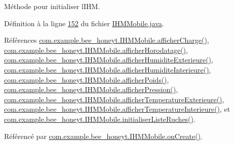 Méthode pour initialiser l\textquotesingle{}I\+HM. 



Définition à la ligne \hyperlink{_i_h_m_mobile_8java_source_l00152}{152} du fichier \hyperlink{_i_h_m_mobile_8java_source}{I\+H\+M\+Mobile.\+java}.



Références \hyperlink{_i_h_m_mobile_8java_source_l00289}{com.\+example.\+bee\+\_\+honeyt.\+I\+H\+M\+Mobile.\+afficher\+Charge()}, \hyperlink{_i_h_m_mobile_8java_source_l00298}{com.\+example.\+bee\+\_\+honeyt.\+I\+H\+M\+Mobile.\+afficher\+Horodatage()}, \hyperlink{_i_h_m_mobile_8java_source_l00262}{com.\+example.\+bee\+\_\+honeyt.\+I\+H\+M\+Mobile.\+afficher\+Humidite\+Exterieure()}, \hyperlink{_i_h_m_mobile_8java_source_l00253}{com.\+example.\+bee\+\_\+honeyt.\+I\+H\+M\+Mobile.\+afficher\+Humidite\+Interieure()}, \hyperlink{_i_h_m_mobile_8java_source_l00271}{com.\+example.\+bee\+\_\+honeyt.\+I\+H\+M\+Mobile.\+afficher\+Poids()}, \hyperlink{_i_h_m_mobile_8java_source_l00280}{com.\+example.\+bee\+\_\+honeyt.\+I\+H\+M\+Mobile.\+afficher\+Pression()}, \hyperlink{_i_h_m_mobile_8java_source_l00244}{com.\+example.\+bee\+\_\+honeyt.\+I\+H\+M\+Mobile.\+afficher\+Temperature\+Exterieure()}, \hyperlink{_i_h_m_mobile_8java_source_l00235}{com.\+example.\+bee\+\_\+honeyt.\+I\+H\+M\+Mobile.\+afficher\+Temperature\+Interieure()}, et \hyperlink{_i_h_m_mobile_8java_source_l00170}{com.\+example.\+bee\+\_\+honeyt.\+I\+H\+M\+Mobile.\+initialiser\+Liste\+Ruches()}.



Référencé par \hyperlink{_i_h_m_mobile_8java_source_l00078}{com.\+example.\+bee\+\_\+honeyt.\+I\+H\+M\+Mobile.\+on\+Create()}.


